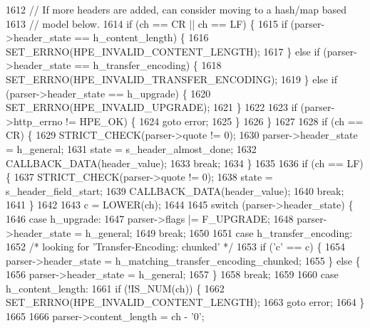 \begin{DoxyCode}
1612         \textcolor{comment}{// If more headers are added, can consider moving to a hash/map based}
1613         \textcolor{comment}{// model below.}
1614         \textcolor{keywordflow}{if} (ch == CR || ch == LF) \{
1615           \textcolor{keywordflow}{if} (parser->header_state == h_content_length) \{
1616             SET_ERRNO(HPE_INVALID_CONTENT_LENGTH);
1617           \} \textcolor{keywordflow}{else} \textcolor{keywordflow}{if} (parser->header_state == h_transfer_encoding) \{
1618             SET_ERRNO(HPE_INVALID_TRANSFER_ENCODING);
1619           \} \textcolor{keywordflow}{else} \textcolor{keywordflow}{if} (parser->header_state == h_upgrade) \{
1620             SET_ERRNO(HPE_INVALID_UPGRADE);
1621           \}
1622 
1623           \textcolor{keywordflow}{if} (parser->http_errno != HPE_OK) \{
1624             \textcolor{keywordflow}{goto} error;
1625           \}
1626         \}
1627 
1628         \textcolor{keywordflow}{if} (ch == CR) \{
1629           STRICT_CHECK(parser->quote != 0);
1630           parser->header_state = h_general;
1631           state = s_header_almost_done;
1632           CALLBACK_DATA(header\_value);
1633           \textcolor{keywordflow}{break};
1634         \}
1635 
1636         \textcolor{keywordflow}{if} (ch == LF) \{
1637           STRICT_CHECK(parser->quote != 0);
1638           state = s_header_field_start;
1639           CALLBACK_DATA(header\_value);
1640           \textcolor{keywordflow}{break};
1641         \}
1642 
1643         c = LOWER(ch);
1644 
1645         \textcolor{keywordflow}{switch} (parser->header_state) \{
1646           \textcolor{keywordflow}{case} h_upgrade:
1647             parser->flags |= F_UPGRADE;
1648             parser->header_state = h_general;
1649             \textcolor{keywordflow}{break};
1650 
1651           \textcolor{keywordflow}{case} h_transfer_encoding:
1652             \textcolor{comment}{/* looking for 'Transfer-Encoding: chunked' */}
1653             \textcolor{keywordflow}{if} (\textcolor{charliteral}{'c'} == c) \{
1654               parser->header_state = h_matching_transfer_encoding_chunked;
1655             \} \textcolor{keywordflow}{else} \{
1656               parser->header_state = h_general;
1657             \}
1658             \textcolor{keywordflow}{break};
1659 
1660           \textcolor{keywordflow}{case} h_content_length:
1661             \textcolor{keywordflow}{if} (!IS_NUM(ch)) \{
1662               SET_ERRNO(HPE_INVALID_CONTENT_LENGTH);
1663               \textcolor{keywordflow}{goto} error;
1664             \}
1665 
1666             parser->content_length = ch - \textcolor{charliteral}{'0'};

\end{DoxyCode}
